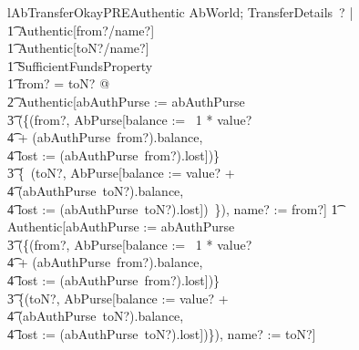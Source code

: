 %
\begin{LNewLemma}
\begin{theorem}{lAbTransferOkayPREAuthentic}
    \forall  AbWorld; TransferDetails~? | \\
        \t1 Authentic[from?/name?] \\
        \t1 \land  Authentic[toN?/name?] \\
        \t1 \land  SufficientFundsProperty \\
        \t1 \land  \lnot  from? = toN? @ \\
            \t2 Authentic[abAuthPurse := abAuthPurse \oplus \\
                \t3 (\{(from?, \theta AbPurse[balance := \negate~1 * value? \\
                    \t4  + (abAuthPurse~from?).balance, \\
                    \t4 lost := (abAuthPurse~from?).lost])\} \\
                \t3 \cup \{~(toN?, \theta AbPurse[balance := value? + \\
                    \t4 (abAuthPurse~toN?).balance, \\
                    \t4 lost := (abAuthPurse~toN?).lost])~\}), 
                    name? := from?]
               \also
        \t1 \land Authentic[abAuthPurse := abAuthPurse \oplus \\
                \t3 (\{(from?, \theta AbPurse[balance := \negate~1 * value? \\
                    \t4 + (abAuthPurse~from?).balance, \\
                    \t4 lost := (abAuthPurse~from?).lost])\} \\
                \t3 \cup \{(toN?, \theta AbPurse[balance := value? + \\
                    \t4 (abAuthPurse~toN?).balance, \\
                    \t4 lost := (abAuthPurse~toN?).lost])\}), 
                    name? := toN?]
\end{theorem}~\end{LNewLemma}
%
